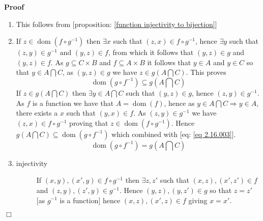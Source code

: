 \documentclass{book}
\newcommand{\tmop}[1]{\ensuremath{\operatorname{#1}}}
\newenvironment{proof}{\noindent\textbf{Proof\ }}{\hspace*{\fill}$\Box$\medskip}
\begin{document}
\begin{proof}
  
  \begin{enumerate}
    \item This follows from [proposition: \ref{function injectivity to
    bijection}]
    
    \item If $z \in \tmop{dom} (f \circ g^{- 1})$ then $\exists x$ such that
    $(z, x) \in f \circ g^{- 1}$, hence $\exists y$ such that $(z, y) \in g^{-
    1} \text{ and } (y, z) \in f$, from which it follows that $(y, z) \in g$
    and $(y, z) \in f$. As $g \subseteq C \times B$ and $f \subseteq A \times
    B$ it follows that $y \in A$ and $y \in C$ so that $y \in A \bigcap C$, as
    $(y, z) \in g$ we have $z \in g \left( A \bigcap C \right)$. This proves
    \begin{equation}
      \label{eq 2.16.003} \tmop{dom} (g \circ f^{- 1}) \subseteq g \left( A
      \bigcap C \right)
    \end{equation}
    If $z \in g \left( A \bigcap C \right)$ then $\exists y \in A \bigcap C$
    such that $(y, z) \in g$, hence $(z, y) \in g^{- 1}$. As $f$ is a function
    we have that $A = \tmop{dom} (f)$, hence as $y \in A \bigcap C \Rightarrow
    y \in A$, there exists a $x$ such that $(y, x) \in f$. As $(z, y) \in g^{-
    1}$ we have $(z, x) \in f \circ g^{- 1}$ proving that $z \in \tmop{dom} (f
    \circ g^{- 1})$. Hence $g \left( A \bigcap C \right) \subseteq \tmop{dom}
    (g \circ f^{- 1})$ which combined with [eq: \ref{eq 2.16.003}].
    \[ \tmop{dom} (g \circ f^{- 1}) = g \left( A \bigcap C \right) \]
    \item 
    \begin{description}
      \item[injectivity] If $(x, y), (x', y) \in f \circ g^{- 1}$ then
      $\exists z, z'$ such that $ (x, z), (x', z') \in f$ and $(z, y), (z', y)
      \in g^{- 1}$. Hence $(y, z), (y, z') \in g$ so that $z = z'$ [as $g^{-
      1}$ is a function] hence $(x, z), (x', z) \in f$ giving $x = x'$.
      

\end{description}
\end{enumerate}
\end{proof}
\end{document}
